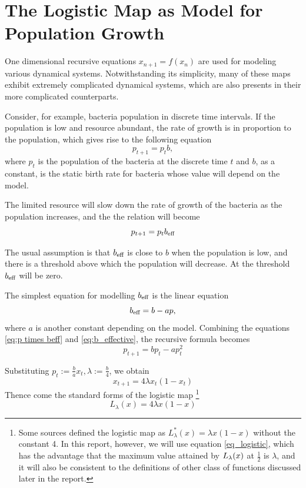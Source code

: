 \section{The Logistic Map as Model for Population Growth}

One dimensional recursive equations $x_{n+1} = f(x_n)$ are used for modeling various dynamical systems. 
Notwithstanding its simplicity, many of these maps exhibit extremely complicated dynamical systems, which are also presents in their more complicated counterparts.

Consider, for example, bacteria population in discrete time intervals. 
If the population is low and resource abundant, the rate of growth is in proportion to the population, which gives rise to the following equation
\begin{equation}\label{eq:1d iterative map}
p_{t+1} = p_{t} b,
\end{equation}
where $p_{t}$ is the population of the bacteria at the discrete time $t$ and $b$, as a constant, is the static birth rate for bacteria whose value will depend on the model.

The limited resource will slow down the rate of growth of the bacteria as the population increases, and the the relation will become 
\begin{equation}\label{eq:p times beff}
	p_{t+1} =  p_{t} b_\text{eff}
\end{equation}

The usual assumption is that $b_\text{eff}$ is close to $b$ when the population is low, and there is a threshold above which the population will decrease. 
At the threshold $b_\text{eff}$ will be zero.

The simplest equation for modelling $b_\text{eff}$ is the linear equation
\begin{equation} \label{eq:b_effective}
b_\text{eff} = b - ap,
\end{equation}
where $a$ is another constant depending on the model.
Combining the equations \eqref{eq:p times beff} and \eqref{eq:b_effective}, the recursive formula becomes 
$$
p_{t+1}  = b p_t - ap_t^2
$$

Substituting $p_{t} := \frac{b}{a} x_{t}, \lambda := \frac{b}{4}$, we obtain
$$
x_{t+1} = 4 \lambda x_t(1-x_t) 
$$
Thence come the standard forms of the logistic map
\footnote{
Some sources defined the logistic map as $L^*_{\lambda}(x) = \lambda x(1-x)$ without the constant 4. 
In this report, however, we will use equation \ref{eq_logistic}, which has the advantage that the maximum value attained by $L_{\lambda}(x)$ at $\frac{1}{2}$ is $\lambda$, and it will also be consistent to the definitions of other class of functions discussed later in the report.
}
\begin{equation}\label{eq_logistic}
	L_{\lambda}(x) = 4 \lambda x(1-x)
\end{equation}

